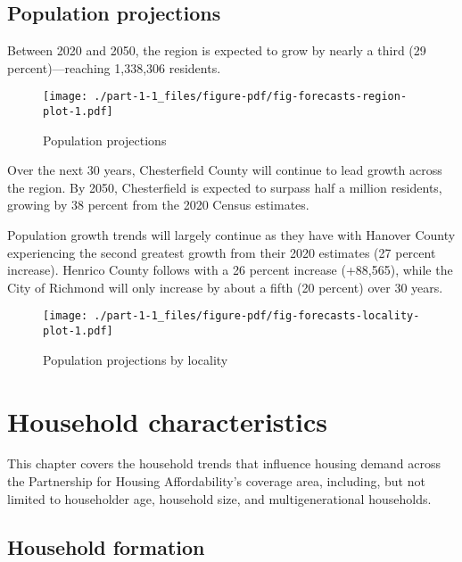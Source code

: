 \documentclass[
  letterpaper,
  DIV=11,
  numbers=noendperiod]{scrreprt}
\begin{document}
\hypertarget{population-projections}{%
\section{Population projections}\label{population-projections}}

Between 2020 and 2050, the region is expected to grow by nearly a third
(29 percent)---reaching 1,338,306 residents.

\begin{figure}

{\centering \texttt{[image: ./part-1-1\_files/figure-pdf/fig-forecasts-region-plot-1.pdf]}

}

\caption{\label{fig-forecasts-region-plot}Population projections}

\end{figure}

Over the next 30 years, Chesterfield County will continue to lead growth
across the region. By 2050, Chesterfield is expected to surpass half a
million residents, growing by 38 percent from the 2020 Census estimates.

Population growth trends will largely continue as they have with Hanover
County experiencing the second greatest growth from their 2020 estimates
(27 percent increase). Henrico County follows with a 26 percent increase
(+88,565), while the City of Richmond will only increase by about a
fifth (20 percent) over 30 years.

\begin{figure}

{\centering \texttt{[image: ./part-1-1\_files/figure-pdf/fig-forecasts-locality-plot-1.pdf]}

}

\caption{\label{fig-forecasts-locality-plot}Population projections by
locality}

\end{figure}

\hypertarget{part-1-2}{%
\chapter{Household characteristics}\label{part-1-2}}

This chapter covers the household trends that influence housing demand
across the Partnership for Housing Affordability's coverage area,
including, but not limited to householder age, household size, and
multigenerational households.

\hypertarget{household-formation}{%
\section{Household formation}\label{household-formation}}
\end{document}
